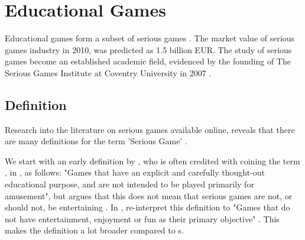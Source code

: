 \documentclass[a4paper,11.5pt]{report}
\numberwithin{figure}{section}
\numberwithin{table}{section}
\numberwithin{equation}{section}
\numberwithin{equation}{section}
\begin{document}




\section{Educational Games}

Educational games form a subset of serious games \citep{Michael2005, Zyda2005}. The market value of serious games industry in 2010, was predicted as 1.5 billion EUR. The study of serious games become an established academic field, evidenced by the founding of The Serious Games Institute at Coventry University in 2007 \citep{Wilkinson2016}.

\subsection{Definition}

Research into the literature on serious games available online, reveals that there are many definitions for the term 'Serious Game' \citep{Johann2015}. 

We start with an early definition by \citeauthor{abt1970}, who is often credited with coining the term \citep{Wilkinson2016}, in \citeyear{abt1970}, as follows: "Games that have an explicit and carefully thought-out educational purpose, and are not intended to be played primarily for amusement", but argues that this does not mean that serious games are not, or should not, be entertaining \citep{abt1970}. In \citeyear{Michael2005}, \citeauthor{Michael2005} re-interpret this definition to "Games that do not have entertainment, enjoyment or fun as their primary objective" \citep{Michael2005}. This makes the definition a lot broader compared to \citeauthor{abt1970}s.
\end{document}
